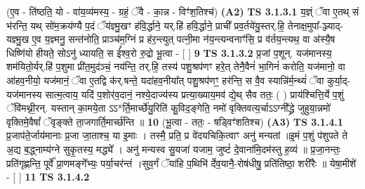 \documentclass[17pt]{extarticle}
\begin{document}
                  \newline
                      (ए॒व - ति॑ष्ठति॒ यो - वा॑य॒व्य॑मस्य॒ - ग्रहं॒ ॅवै - का॒न्न - विꣳ॑श॒तिश्च॑)  \textbf{(A2)} \newline \newline
                                        \textbf{ TS 3.1.3.1} \newline
                  य॒ज्ञ्ं ॅवा ए॒तथ् सं भ॑रन्ति॒ यथ् सो॑म॒क्रय॑ण्यै प॒दं ॅय॑ज्ञ्मु॒खꣳ ह॑वि॒र्द्धाने॒ यर्.हि॑ हवि॒र्द्धाने॒ प्राची᳚ प्रव॒र्तये॑यु॒स्तर्.हि॒ तेनाक्ष॒मुपा᳚-ञ्ज्याद्-यज्ञ्मु॒ख ए॒व य॒ज्ञ्मनु॒ सन्त॑नोति॒ प्राञ्च॑म॒ग्निं प्र ह॑र॒न्त्युत् पत्नी॒मा न॑य॒न्त्यन्वनाꣳ॑सि॒ प्र व॑र्तय॒न्त्यथ॒ वा अ॑स्यै॒ष धिष्णि॑यो हीयते॒ सोऽनु॑ ध्यायति॒ स ई᳚श्व॒रो रु॒द्रो भू॒त्वा - [  ] \textbf{  9} \newline
                  \newline
                                \textbf{ TS 3.1.3.2} \newline
                  प्र॒जां प॒शून्. यज॑मानस्य॒ शम॑यितो॒र्यर्.हि॑ प॒शुमा प्री॑त॒मुद॑ञ्चं॒ नय॑न्ति॒ तर्.हि॒ तस्य॑ पशु॒श्रप॑णꣳ हरे॒त् तेनै॒वैनं॑ भा॒गिनं॑ करोति॒ यज॑मानो॒ वा आ॑हव॒नीयो॒ यज॑मानं॒ ॅवा ए॒तद्वि क॑र्.षन्ते॒ यदा॑हव॒नीया᳚त् पशु॒श्रप॑णꣳ॒॒ हर॑न्ति॒ स वै॒व स्यान्नि॑र्म॒न्थ्यं॑ ॅवा कुर्या॒द्-यज॑मानस्य सात्म॒त्वाय॒ यदि॑ प॒शोर॑व॒दानं॒ नश्ये॒दाज्य॑स्य प्रत्या॒ख्याय॒मव॑ द्ये॒थ् सैव ततः॒ ( ) प्राय॑श्चित्ति॒र्ये प॒शुं ॅवि॑मथ्नी॒रन्. यस्तान् का॒मये॒ता ऽऽ*र्ति॒मार्च्छे॑यु॒रिति॑ कु॒विद॒ङ्गेति॒ नमो॑ वृक्तिवत्य॒र्चाऽऽग्नी᳚द्ध्रे जुहुया॒न्नमो॑ वृक्तिमे॒वैषां᳚ ॅवृङ्क्ते ता॒जगार्ति॒मार्च्छ॑न्ति ॥ \textbf{  10} \newline
                  \newline
                      (भू॒त्वा - ततः॒ - षड्विꣳ॑शतिश्च)  \textbf{(A3)} \newline \newline
                                        \textbf{ TS 3.1.4.1} \newline
                  प्र॒जाप॑ते॒र्जाय॑मानाः प्र॒जा जा॒ताश्च॒ या इ॒माः । तस्मै॒ प्रति॒ प्र वे॑दयचिकि॒त्वाꣳ अनु॑ मन्यतां ॥इ॒मं प॒शुं प॑शुपते ते अ॒द्य ब॒द्ध्नाम्य॑ग्ने सुकृ॒तस्य॒ मद्ध्ये᳚ । अनु॑ मन्यस्व सु॒यजा॑ यजाम॒ जुष्टं॑ दे॒वाना॑मि॒दम॑स्तु ह॒व्यं ॥ प्र॒जा॒नन्तः॒ प्रति॑गृह्णन्ति॒ पूर्वे᳚ प्रा॒णमङ्गे᳚भ्यः॒ पर्या॒चर॑न्तं ।सुव॒र्गं ॅया॑हि प॒थिभि॑ र्देव॒यानै॒-रोष॑धीषु॒ प्रति॑तिष्ठा॒ शरी॑रैः ॥ येषा॒मीशे॑ - [  ] \textbf{  11} \newline
                  \newline
                                \textbf{ TS 3.1.4.2} \newline
\end{document}
